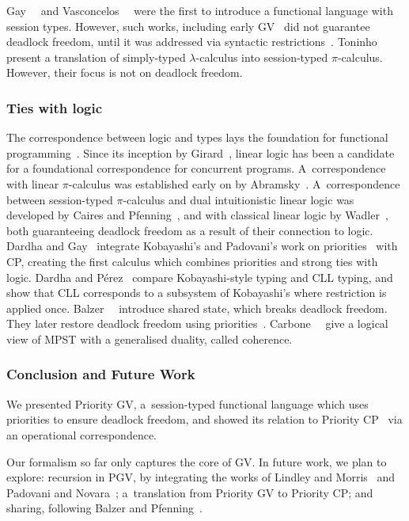 \documentclass[main.tex]{subfiles}
\begin{document}
Gay~\etal~\cite{gaynagarajan03} and Vasconcelos~\etal~\cite{vasconcelosravara04,vasconcelosgay06} were the first to introduce a functional language with session types. However, such works, including early GV~\cite{gayvasconcelos10,gayvasconcelos12} did not guarantee deadlock freedom, until it was addressed via syntactic restrictions~\cite{lindleymorris15,wadler15}. Toninho~\etal~\cite{toninhocaires12} present a translation of simply-typed $\lambda$-calculus into session-typed $\pi$-calculus. However, their focus is not on deadlock freedom.

\subsubsection*{Ties with logic}
The correspondence between logic and types lays the foundation for functional programming~\cite{wadler15}. Since its inception by Girard~\cite{girard87}, linear logic has been a candidate for a foundational correspondence for concurrent programs. A~correspondence with linear $\pi$-calculus was established early on by Abramsky~\cite{abramsky94,bellinscott94}. A~correspondence between session-typed $\pi$-calculus and dual intuitionistic linear logic was developed by Caires and Pfenning~\cite[$\pi\text{DILL}$]{cairespfenning10}, and with classical linear logic by Wadler~\cite[CP]{wadler15}, both guaranteeing deadlock freedom as a result of their connection to logic. Dardha and Gay~\cite[PCP]{dardhagay18} integrate Kobayashi's and Padovani's work on priorities~\cite{kobayashi06,padovani14} with CP, creating the first calculus which combines priorities and strong ties with logic. Dardha and P\'{e}rez~\cite{dardhaperez15} compare Kobayashi-style typing and CLL typing, and show that CLL corresponds to a subsystem of Kobayashi's where restriction is applied once. Balzer~\etal~\cite[$\text{SILL}_S$]{balzerpfenning17} introduce shared state, which breaks deadlock freedom. They later restore deadlock freedom using priorities~\cite[$\text{SILL}_{S+}$]{balzertoninho19}.
Carbone~\etal~\cite{carbonelindley16} give a logical view of MPST with a generalised duality, called coherence.

\subsubsection*{Conclusion and Future Work}
We presented Priority GV, a~session-typed functional language which uses priorities to ensure deadlock freedom, and showed its relation to Priority CP~\cite{dardhagay18} via an operational correspondence.

Our formalism so far only captures the core of GV. In future work, we plan to explore: recursion in PGV, by integrating the works of Lindley and Morris~\cite{lindleymorris16} and Padovani and Novara~\cite{padovaninovara15}; a~translation from Priority GV to Priority CP; and sharing, following Balzer and Pfenning~\cite{balzerpfenning17}.
\end{document}

